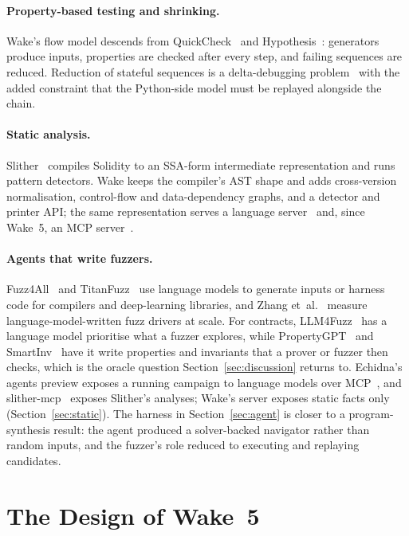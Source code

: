 \documentclass[11pt,a4paper]{article}
\newcommand{\wake}{Wake}
\begin{document}
\paragraph{Property-based testing and shrinking.}
\wake{}'s flow model descends from QuickCheck~\cite{claessen2000quickcheck} and Hypothesis~\cite{maciver2019hypothesis}: generators produce inputs, properties are checked after every step, and failing sequences are reduced. Reduction of stateful sequences is a delta-debugging problem~\cite{zeller2002simplifying,regehr2012creduce} with the added constraint that the Python-side model must be replayed alongside the chain.

\paragraph{Static analysis.}
Slither~\cite{feist2019slither} compiles Solidity to an SSA-form intermediate representation and runs pattern detectors. \wake{} keeps the compiler's AST shape and adds cross-version normalisation, control-flow and data-dependency graphs, and a detector and printer API; the same representation serves a language server~\cite{lsp} and, since \wake{}~5, an MCP server~\cite{mcp}.

\paragraph{Agents that write fuzzers.}
Fuzz4All~\cite{xia2024fuzz4all} and TitanFuzz~\cite{deng2023titanfuzz} use language models to generate inputs or harness code for compilers and deep-learning libraries, and Zhang et~al.~\cite{zhang2024fuzzdriver} measure language-model-written fuzz drivers at scale. For contracts, LLM4Fuzz~\cite{shou2024llm4fuzz} has a language model prioritise what a fuzzer explores, while PropertyGPT~\cite{liu2025propertygpt} and SmartInv~\cite{wang2024smartinv} have it write properties and invariants that a prover or fuzzer then checks, which is the oracle question Section~\ref{sec:discussion} returns to. Echidna's agents preview exposes a running campaign to language models over MCP~\cite{echidna230}, and slither-mcp~\cite{slithermcp} exposes Slither's analyses; \wake{}'s server exposes static facts only (Section~\ref{sec:static}). The harness in Section~\ref{sec:agent} is closer to a program-synthesis result: the agent produced a solver-backed navigator rather than random inputs, and the fuzzer's role reduced to executing and replaying candidates.

\section{The Design of \wake{}~5}
\label{sec:design}
\end{document}
